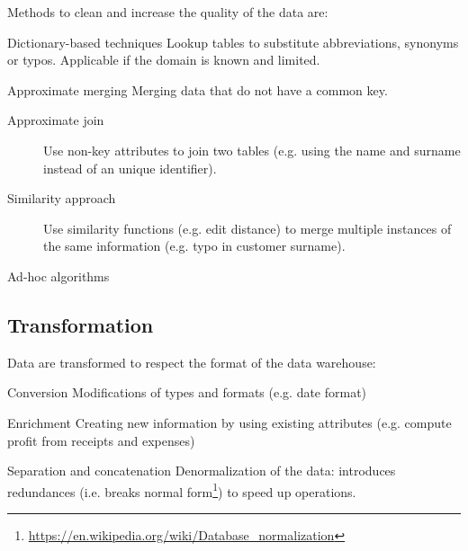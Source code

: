 Methods to clean and increase the quality of the data are:
\begin{descriptionlist}
    \item[Dictionary-based techniques] 
        Lookup tables to substitute abbreviations, synonyms or typos.
        Applicable if the domain is known and limited.
        
    \item[Approximate merging] 
        Merging data that do not have a common key.
        \begin{description}
            \item[Approximate join]
                Use non-key attributes to join two tables (e.g. using the name and surname instead of an unique identifier).

            \item[Similarity approach]
                Use similarity functions (e.g. edit distance) to merge multiple instances of the same information
                (e.g. typo in customer surname).
        \end{description}
    
    \item[Ad-hoc algorithms] 
\end{descriptionlist}


\subsection{Transformation}
Data are transformed to respect the format of the data warehouse:
\begin{descriptionlist}
    \item[Conversion] 
        Modifications of types and formats (e.g. date format)
    
    \item[Enrichment] 
        Creating new information by using existing attributes (e.g. compute profit from receipts and expenses)

    \item[Separation and concatenation] 
        Denormalization of the data: introduces redundances (i.e. breaks normal form\footnote{\url{https://en.wikipedia.org/wiki/Database_normalization}}) 
        to speed up operations.
\end{descriptionlist}


